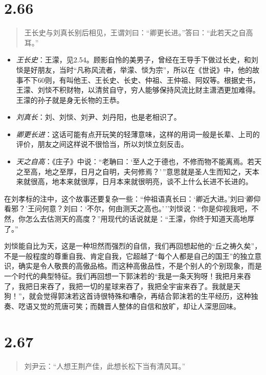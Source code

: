 \documentclass[]{book}
\providecommand{\tightlist}{%
  \setlength{\itemsep}{0pt}\setlength{\parskip}{0pt}}
\begin{document}
\section{2.66}\label{section-112}

\begin{quote}
王长史与刘真长别后相见，王谓刘曰：``卿更长进。''答曰：``此若天之自高耳。''
\end{quote}

\begin{itemize}
\tightlist
\item
  \emph{王长史}：王濛，见2.54。顾影自怜的美男子，曾经在王导手下做过长史，和刘惔是好朋友，当时``凡称风流者，举濛、惔为宗''，所以在《世说》中，他的故事不下60则，有叫他王、王长史、长史、仲祖、王仲祖、阿奴等。根据史书，王濛、刘惔不积财物，以清贫自守，穷人能够保持风流比财主潇洒更加难得。王濛的孙子就是身无长物的王恭。
\item
  \emph{刘真长}：刘、刘惔、刘尹、刘丹阳，也是老相识了。
\item
  \emph{卿更长进}：这话可能有点开玩笑的轻薄意味，这样的用词一般是长辈、上司的评价，朋友之间这样说不很恰当，所以刘惔立刻反击。
\item
  \emph{天之自高}：《庄子》中说：``老聃曰：`至人之于德也，不修而物不能离焉。若天之至高，地之至厚，日月之自明，夫何修焉？'\,''意思就是圣人生而知之，天本来就很高，地本来就很厚，日月本来就很明亮，谈不上什么长进不长进的。
\end{itemize}

在刘孝标的注中，这个故事还要复杂一些：``仲祖语真长曰：`卿近大进。'刘曰`卿仰看邪？'王问何意？刘曰：`不尔，何由测天之高也。'\,''刘惔说：``你是仰视我吧，不然，你怎么去估测天的高度？''用现代的话说就是：``王濛，你终于知道天高地厚了。''

刘惔能自比为天，这是一种坦然而强烈的自信，我们再回想起他的``丘之祷久矣''，不是一般程度的尊重自我、肯定自我，它超越了``每个人都是自己的国王''的独立意识，确实是令人敬畏的高傲品格。而这种高傲品性，不是个别人的个别现象，而是一个时代的典型特征。我们再回想一下郭沫若的``我是一条天狗呀！我把月来吞了，我把日来吞了，我把一切的星球来吞了，我把全宇宙来吞了。我就是天狗！''，就会觉得郭沫若这首诗很特殊和嘈杂，再结合郭沫若的生平经历，这种独奏、呓语又觉的荒唐可笑；而魏晋人整体的自信和放旷，却让人深思回味。

\section{2.67}\label{section-113}

\begin{quote}
刘尹云：``人想王荆产佳，此想长松下当有清风耳。''
\end{quote}
\end{document}
